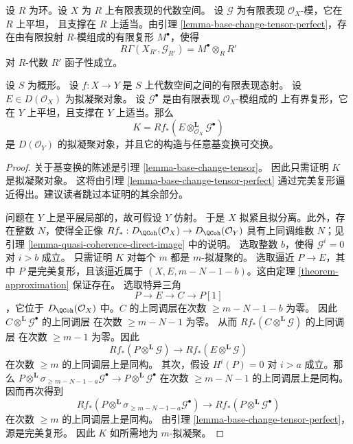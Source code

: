 \begin{remark}
\label{remark-explain-perfect-direct-image}
设 $R$ 为环。设 $X$ 为 $R$ 上有限表现的代数空间。
设 $\mathcal{G}$ 为有限表现 $\mathcal{O}_X$-模，它在 $R$ 上平坦，
且支撑在 $R$ 上适当。由引理
\ref{lemma-base-change-tensor-perfect}，存在由有限投射
$R$-模组成的有限复形 $M^\bullet$，使得
$$
R\Gamma(X_{R'}, \mathcal{G}_{R'}) = M^\bullet \otimes_R R'
$$
对 $R$-代数 $R'$ 函子性成立。
\end{remark}

\begin{lemma}
\label{lemma-base-change-tensor-pseudo-coherent}
设 $S$ 为概形。
设 $f : X \to Y$ 是 $S$ 上代数空间之间的有限表现态射。
设 $E \in D(\mathcal{O}_X)$ 为拟凝聚对象。
设 $\mathcal{G}^\bullet$ 是由有限表现 $\mathcal{O}_X$-模组成的
上有界复形，它在 $Y$ 上平坦，且支撑在 $Y$ 上适当。那么
$$
K = Rf_*(E \otimes_{\mathcal{O}_X}^\mathbf{L} \mathcal{G}^\bullet)
$$
是 $D(\mathcal{O}_Y)$ 的拟凝聚对象，并且它的构造与任意基变换可交换。
\end{lemma}

\begin{proof}
关于基变换的陈述是引理 \ref{lemma-base-change-tensor}。
因此只需证明 $K$ 是拟凝聚对象。
这将由引理 \ref{lemma-base-change-tensor-perfect}
通过完美复形逼近得出。建议读者跳过本证明的其余部分。

\medskip\noindent
问题在 $Y$ 上是平展局部的，故可假设 $Y$ 仿射。
于是 $X$ 拟紧且拟分离。此外，存在整数 $N$，使得全正像
$Rf_* : D_\QCoh(\mathcal{O}_X) \to D_\QCoh(\mathcal{O}_Y)$
具有上同调维数 $N$；见引理
\ref{lemma-quasi-coherence-direct-image} 中的说明。
选取整数 $b$，使得 $\mathcal{G}^i = 0$ 对 $i > b$ 成立。
只需证明 $K$ 对每个 $m$ 都是 $m$-拟凝聚的。
选取逼近 $P \to E$，其中 $P$ 是完美复形，且该逼近属于
$(X, E, m - N - 1 - b)$。这由定理
\ref{theorem-approximation} 保证存在。
选取特异三角
$$
P \to E \to C \to P[1]
$$
，它位于 $D_\QCoh(\mathcal{O}_X)$ 中。$C$ 的上同调层在次数
$\geq m - N - 1 - b$ 为零。
因此 $C \otimes^\mathbf{L} \mathcal{G}^\bullet$ 的上同调层
在次数 $\geq m - N - 1$ 为零。
从而 $Rf_*(C \otimes^\mathbf{L} \mathcal{G})$ 的上同调层 %
在次数 $\geq m - 1$ 为零。因此
$$
Rf_*(P \otimes^\mathbf{L} \mathcal{G}) \to
Rf_*(E \otimes^\mathbf{L} \mathcal{G})
$$
在次数 $\geq m$ 的上同调层上是同构。
其次，假设 $H^i(P) = 0$ 对 $i > a$ 成立。那么
$
P \otimes^\mathbf{L} \sigma_{\geq m - N - 1 - a}\mathcal{G}^\bullet
\longrightarrow
P \otimes^\mathbf{L} \mathcal{G}^\bullet
$
在次数 $\geq m - N - 1$ 的上同调层上是同构。
因而再次得到
$$
Rf_*(P \otimes^\mathbf{L} \sigma_{\geq m - N - 1 - a}\mathcal{G}^\bullet) \to
Rf_*(P \otimes^\mathbf{L} \mathcal{G}^\bullet)
$$
在次数 $\geq m$ 的上同调层上是同构。
由引理 \ref{lemma-base-change-tensor-perfect}，源是完美复形。
因此 $K$ 如所需地为 $m$-拟凝聚。
\end{proof}

